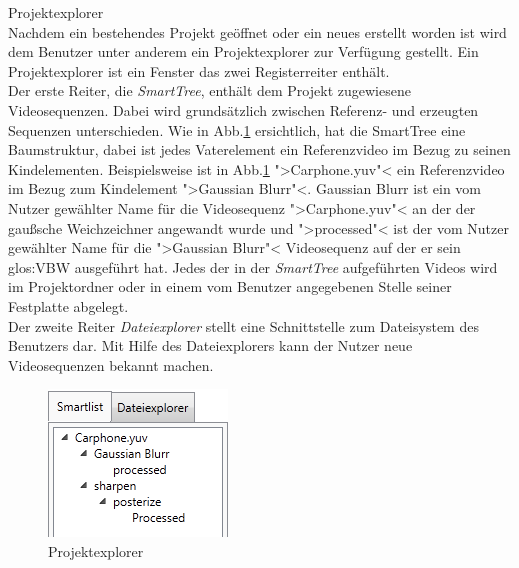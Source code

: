  Projektexplorer \\
Nachdem ein bestehendes Projekt geöffnet oder ein neues erstellt worden ist wird dem
Benutzer unter anderem ein Projektexplorer zur Verfügung gestellt. Ein Projektexplorer ist ein 
Fenster das zwei Registerreiter enthält. \\
Der erste Reiter, die \emph{SmartTree}, enthält dem Projekt zugewiesene Videosequenzen. Dabei wird
grundsätzlich zwischen Referenz- und erzeugten Sequenzen unterschieden. Wie in Abb.\ref{pExplorer}
ersichtlich, hat die SmartTree eine Baumstruktur, dabei ist jedes Vaterelement
ein Referenzvideo im Bezug zu seinen Kindelementen. Beispielsweise ist in Abb.\ref{pExplorer}
">Carphone.yuv"< ein Referenzvideo im Bezug zum Kindelement ">Gaussian Blurr"<. Gaussian Blurr ist ein
vom Nutzer gewählter Name für die Videosequenz ">Carphone.yuv"< an der der gaußsche Weichzeichner angewandt
wurde und ">processed"< ist der vom Nutzer gewählter Name für die ">Gaussian Blurr"< Videosequenz auf
der er sein \gls{glos:VBW} ausgeführt hat. Jedes der in der \emph{SmartTree} aufgeführten Videos wird im Projektordner oder in einem vom Benutzer angegebenen Stelle seiner Festplatte abgelegt.\\
Der zweite Reiter \emph{Dateiexplorer} stellt eine Schnittstelle zum Dateisystem des Benutzers dar. Mit Hilfe
des Dateiexplorers kann der Nutzer \projektTitel neue Videosequenzen bekannt machen.
\begin{figure}[h]
\includegraphics[scale=1]{bilder/projektexplorer.png}
\caption{Projektexplorer}
\label{pExplorer}
\end{figure}

